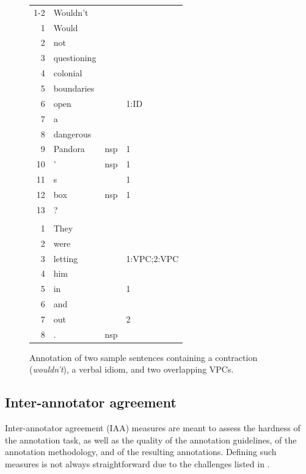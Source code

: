 \documentclass[output=paper,
modfonts,
]{langscibook}
\begin{document}
\begin{figure}[ht]
\centering
\begin{small}
\setlength{\tabcolsep}{5.5mm}
\begin{tabular}{rlll}
1-2 & Wouldn't & & \\
1   & Would & & \\
2   & not & & \\
3   & questioning & & \\     
4   & colonial & & \\
5   & boundaries & & \\ 
6   & open & & 1:ID \\
7   & a & & \\
8   & dangerous & &  \\
9   & Pandora  & nsp & 1 \\
10  & '        & nsp & 1 \\
11  & s        &     & 1 \\
12  & box      & nsp & 1  \\
13  & ? & &  \\
&&& \\
1 & They & & \\
2 & were & & \\
3   & letting & & 1:VPC;2:VPC \\
4   & him & & \\
5   & in  & & 1 \\
6   & and & &  \\
7   & out & & 2 \\
8   & .  & nsp &  \\
\end{tabular}
\end{small}
\caption{Annotation of two sample sentences containing a contraction (\textit{wouldn't}), a verbal idiom, and two overlapping VPCs.}
\label{fig:format}
\end{figure}

\subsection{Inter-annotator agreement}
\label{sec:iaa}
%

Inter-annotator agreement (IAA) measures are meant to assess the hardness of the annotation task, as well as the quality of the annotation guidelines, of the annotation methodology, and of the resulting annotations. Defining such measures is not always straightforward due to the challenges listed in .
\end{document}
